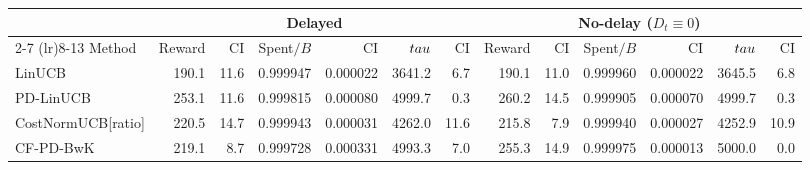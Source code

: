 \begin{tabular}{lrrrrrr|rrrrrr}
\toprule
 & \multicolumn{6}{c}{Delayed} & \multicolumn{6}{c}{No-delay ($D_t\equiv0$)} \\
\cmidrule(lr){2-7} \cmidrule(lr){8-13}
Method & Reward & CI & Spent$/B$ & CI & $\\tau$ & CI & Reward & CI & Spent$/B$ & CI & $\\tau$ & CI \\
\midrule
LinUCB & 190.1 & 11.6 & 0.999947 & 0.000022 & 3641.2 & 6.7 & 190.1 & 11.0 & 0.999960 & 0.000022 & 3645.5 & 6.8 \\
PD-LinUCB & 253.1 & 11.6 & 0.999815 & 0.000080 & 4999.7 & 0.3 & 260.2 & 14.5 & 0.999905 & 0.000070 & 4999.7 & 0.3 \\
CostNormUCB[ratio] & 220.5 & 14.7 & 0.999943 & 0.000031 & 4262.0 & 11.6 & 215.8 & 7.9 & 0.999940 & 0.000027 & 4252.9 & 10.9 \\
CF-PD-BwK & 219.1 & 8.7 & 0.999728 & 0.000331 & 4993.3 & 7.0 & 255.3 & 14.9 & 0.999975 & 0.000013 & 5000.0 & 0.0 \\
\bottomrule
\end{tabular}
